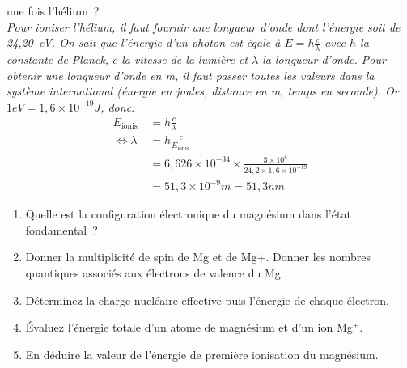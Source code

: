 \begin{enumerate}[\bf 1)]
une fois l'h\'elium~? \\
\textsl{%
Pour ioniser l'hélium, il faut fournir une longueur d'onde dont l'énergie soit de 24,20~eV.
On sait que l'énergie d'un photon est égale à $E=h\frac{c}{\lambda}$ avec $h$ la constante
de Planck, $c$ la vitesse de la lumière et $\lambda$ la longueur d'onde.
Pour obtenir une longueur d'onde en m, il faut passer toutes les valeurs dans la système international
(énergie en joules, distance en m, temps en seconde).
Or $1eV=1,6\times10^{-19}J$, donc:
\begin{align*}
E_\text{ionis.} &= h\frac{c}{\lambda}\\
\Leftrightarrow \lambda &=  h\frac{c}{E_\text{ionis.}}\\
                &= 6,626\times 10^{-34} \times \frac{3\times 10^{8}}{24,2\times 1,6\times10^{-19}}\\
                &= 51,3\times10^{-9} m = 51,3 nm
\end{align*}
}
\end{enumerate}
\begin{enumerate}[\bf 1)]
\item Quelle est la configuration \'electronique du magn\'esium dans l'\'etat fondamental~?
\item Donner la multiplicité de spin de Mg et de Mg+.
Donner les nombres quantiques associés aux électrons de valence du Mg.
\item D\'eterminez la charge nucl\'eaire effective puis l'\'energie de chaque \'electron.
\item \'Evaluez l'\'energie totale d'un atome de magn\'esium et d'un ion Mg$^+$.
\item En d\'eduire la valeur de l'\'energie de premi\`ere ionisation du magn\'esium.
\end{enumerate}
